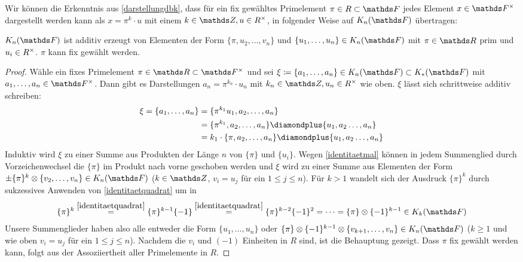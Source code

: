 \documentclass[ngerman,fontsize=11pt, paper=a4, parskip=half, titlepage=true, toc=bib]{scrartcl}
\begin{document}
Wir können die Erkenntnis aus \ref{darstellungdbk},
dass für ein fix gewähltes Primelement $\pi\in R\subset \F$
jedes Element $x\in\Fx$ dargestellt werden kann als 
$x=\pi^k\cdot u$ mit einem $k\in\Z, u\in \Rx$,
in folgender Weise auf $\KnF$ übertragen:

\begin{Lem}\label{darstellungknf}
  $\KnF$ ist additiv erzeugt von Elementen der Form 
  $\{\pi, u_{2},\dotsc,v_n\}$
  und $\{u_{1},\dotsc,u_n\}\in\KnF$ mit $\pi\in\R$ prim und
  $u_i\in R^\times$.
  $\pi$ kann fix gewählt werden.
  \begin{proof}
    Wähle ein fixes Primelement $\pi\in\R\subset\Fx$
    und sei $\xi\coloneqq\{a_1,\dotsc, a_n\}\in\KnF\subset\KF$ mit
    $a_1,\dotsc,a_n\in\Fx$. Dann gibt es Darstellungen
    $a_n=\pi^{k_n}\cdot u_n$ mit $k_n\in\Z,u_n\in \Rx$ wie
    oben. $\xi$ lässt sich schrittweise additiv schreiben:
    \begin{align*}
      \xi=\{a_1,\dotsc,a_n\}
      &=\{\pi^{k_1}u_1, a_2, \dotsc, a_n\}\\
      &=\{\pi^{k_1}, a_2, \dotsc, a_n\}
        \p\{u_1, a_2 \dotsc, a_n\}\\
      &=k_1\cdot \{\pi,a_2, \dotsc, a_n\}
        \p\{u_1, a_2 \dotsc, a_n\}
    \end{align*}
    Induktiv wird $\xi$ zu einer Summe aus Produkten der Länge $n$ von
    $\{\pi\}$ und $\{u_i\}$.
    Wegen \ref{identitaetmal} können in jedem Summenglied durch
    Vorzeichenwechsel die $\{\pi\}$ im Produkt nach vorne geschoben werden
    und $\xi$ wird zu einer Summe aus Elementen der Form
    $\pm\{\pi\}^k\otimes\{v_{2},\dotsc,v_n\}\in\KnF$ 
    ($k\in\Z$, $v_i=u_j$ für ein $1\leq j\leq n$).
    Für $k>1$ wandelt sich der Ausdruck $\{\pi\}^k$ durch
    sukzessives Anwenden von \ref{identitaetquadrat} um in
    \begin{gather*}
      \{\pi\}^k
      \overset{\ref{identitaetquadrat}}{=} \{\pi\}^{k-1}\{-1\}
      \overset{\ref{identitaetquadrat}}{=} \{\pi\}^{k-2}\{-1\}^2
      =\dotsb=\{\pi\}\otimes\{-1\}^{k-1} \in\K_{k}(\F)
    \end{gather*}
    Unsere Summenglieder haben also alle entweder die Form 
    $\{u_1,\dotsc, u_n\}$ oder
    $\{\pi\}\otimes\{-1\}^{k-1}\otimes\{v_{k+1},\dotsc,v_n\}\in\KnF$
    ($k\geq 1$ und wie oben $v_i=u_j$ für ein $1\leq j\leq n$).
    Nachdem die $v_i$ und $(-1)$ Einheiten in $R$ sind,
    ist die Behauptung gezeigt.
    Dass $\pi$ fix gewählt werden kann, folgt aus der Assoziiertheit
    aller Primelemente in $R$.
  \end{proof}
\end{Lem}
\end{document}
